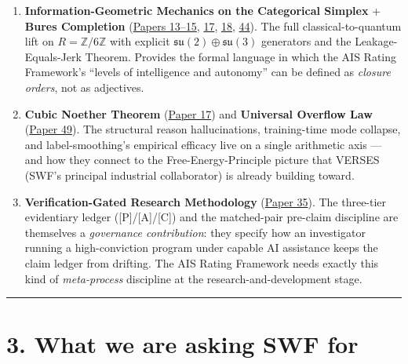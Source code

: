 \documentclass[
  letterpaper,
  11pt]{article}
\providecommand{\tightlist}{%
  \setlength{\itemsep}{0pt}\setlength{\parskip}{0pt}}
\theoremstyle{plain}
\theoremstyle{definition}
\theoremstyle{remark}
\begin{document}
\begin{enumerate}
\def\labelenumi{\arabic{enumi}.}
\setcounter{enumi}{11}
\tightlist
\item
  \textbf{Information-Geometric Mechanics on the Categorical Simplex} + \textbf{Bures Completion} (\href{C:/Projects/simplicial/13.simplectic_mechanics_on_the_categorical_simplex.md}{Papers 13--15}, \href{C:/Projects/simplicial/17.the_cubic_noether_theorem.md}{17}, \href{C:/Projects/simplicial/18.bures_completion_of_cubic_information_geometric_mechanics.md}{18}, \href{C:/Projects/simplicial/44_quantization_forced_cubic_to_bures_bridge.md}{44}). The full classical-to-quantum lift on \(R = \mathbb{Z}/6\mathbb{Z}\) with explicit \(\mathfrak{su}(2) \oplus \mathfrak{su}(3)\) generators and the Leakage-Equals-Jerk Theorem. Provides the formal language in which the AIS Rating Framework's ``levels of intelligence and autonomy'' can be defined as \emph{closure orders}, not as adjectives.
\item
  \textbf{Cubic Noether Theorem} (\href{C:/Projects/simplicial/17.the_cubic_noether_theorem.md}{Paper 17}) and \textbf{Universal Overflow Law} (\href{C:/Projects/simplicial/49_arithmetic_decoupling_of_projection_closure_overflows.md}{Paper 49}). The structural reason hallucinations, training-time mode collapse, and label-smoothing's empirical efficacy live on a single arithmetic axis --- and how they connect to the Free-Energy-Principle picture that VERSES (SWF's principal industrial collaborator) is already building toward.
\item
  \textbf{Verification-Gated Research Methodology} (\href{C:/Projects/simplicial/35_grounded_paranoid_delusional_methodology.md}{Paper 35}). The three-tier evidentiary ledger ({[}P{]}/{[}A{]}/{[}C{]}) and the matched-pair pre-claim discipline are themselves a \emph{governance contribution}: they specify how an investigator running a high-conviction program under capable AI assistance keeps the claim ledger from drifting. The AIS Rating Framework needs exactly this kind of \emph{meta-process} discipline at the research-and-development stage.
\end{enumerate}

\begin{center}\rule{0.5\linewidth}{0.5pt}\end{center}

\section{3. What we are asking SWF for}\label{what-we-are-asking-swf-for}
\end{document}
